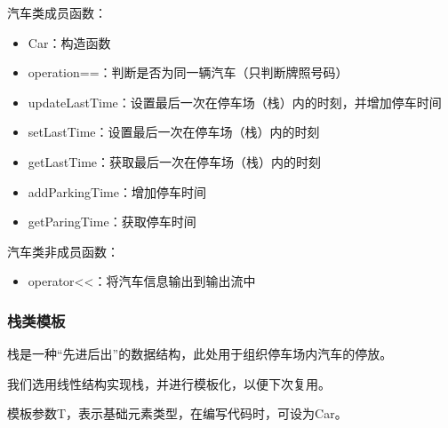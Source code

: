 \documentclass{ctexart}
\begin{document}
    汽车类成员函数：
    \begin{itemize}\ttfamily
        \item Car：构造函数
        \item operation==：判断是否为同一辆汽车（只判断牌照号码）
        \item updateLastTime：设置最后一次在停车场（栈）内的时刻，并增加停车时间
        \item setLastTime：设置最后一次在停车场（栈）内的时刻
        \item getLastTime：获取最后一次在停车场（栈）内的时刻
        \item addParkingTime：增加停车时间
        \item getParingTime：获取停车时间
    \end{itemize}

    汽车类非成员函数：
    \begin{itemize}\ttfamily
        \item operator<<：将汽车信息输出到输出流中
    \end{itemize}
    
    \subsubsection{栈类模板}
    栈是一种“先进后出”的数据结构，此处用于组织停车场内汽车的停放。

    我们选用线性结构实现栈，并进行模板化，以便下次复用。

    模板参数T\footnotemark[1]，表示基础元素类型，在编写代码时，可设为Car。
    
\end{document}
